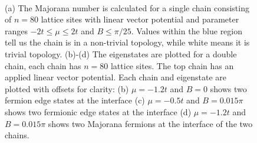 \documentclass[aps,prb,showpacs,twocolumn,amsmath,amssymb,superscriptaddress]{revtex4-2}
\begin{document}
\begin{figure}[]
  \\
\caption{(a) The Majorana number is calculated for a single chain consisting of $n=80$ lattice sites with linear vector potential and parameter ranges $-2t \leq \mu \leq 2t$ and $B\leq \pi/25$. Values within the blue region tell us the chain is in a non-trivial topology, while white means it is trivial topology. (b)-(d) The eigenstates are plotted for a double chain, each chain has $n=80$ lattice sites. The top chain has an applied linear vector potential. Each chain and eigenstate are plotted with offsets for clarity: (b) $\mu=-1.2t$ and $B=0$ shows two fermion edge states at the interface (c) $\mu=-0.5t$ and $B=0.015\pi$ shows two fermionic edge states at the interface (d) $\mu=-1.2t$ and $B=0.015\pi$ shows two Majorana fermions at the interface of the two chains.}
\label{fig:majorana-number}
\end{figure}
\end{document}
